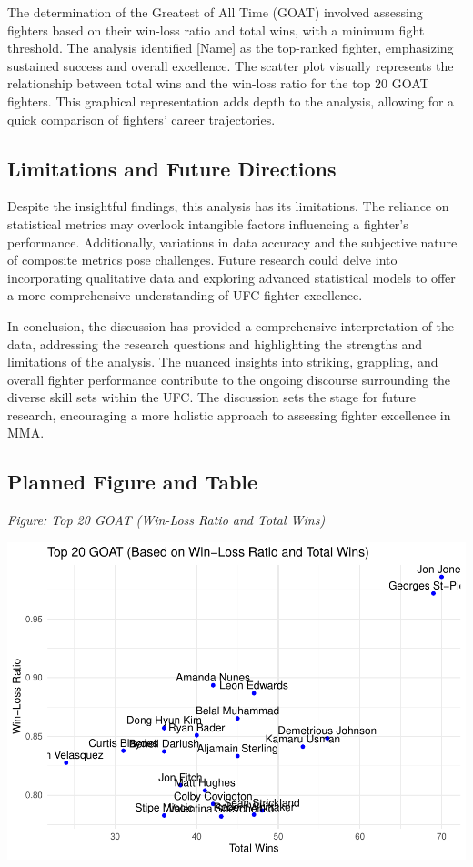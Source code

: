 \documentclass[
  man,floatsintext]{apa6}
\begin{document}
The determination of the Greatest of All Time (GOAT) involved assessing fighters based on their win-loss ratio and total wins, with a minimum fight threshold. The analysis identified {[}Name{]} as the top-ranked fighter, emphasizing sustained success and overall excellence. The scatter plot visually represents the relationship between total wins and the win-loss ratio for the top 20 GOAT fighters. This graphical representation adds depth to the analysis, allowing for a quick comparison of fighters' career trajectories.

\hypertarget{limitations-and-future-directions}{%
\subsection{Limitations and Future Directions}\label{limitations-and-future-directions}}

Despite the insightful findings, this analysis has its limitations. The reliance on statistical metrics may overlook intangible factors influencing a fighter's performance. Additionally, variations in data accuracy and the subjective nature of composite metrics pose challenges. Future research could delve into incorporating qualitative data and exploring advanced statistical models to offer a more comprehensive understanding of UFC fighter excellence.

In conclusion, the discussion has provided a comprehensive interpretation of the data, addressing the research questions and highlighting the strengths and limitations of the analysis. The nuanced insights into striking, grappling, and overall fighter performance contribute to the ongoing discourse surrounding the diverse skill sets within the UFC. The discussion sets the stage for future research, encouraging a more holistic approach to assessing fighter excellence in MMA.

\hypertarget{planned-figure-and-table}{%
\subsection{Planned Figure and Table}\label{planned-figure-and-table}}

\emph{Figure: Top 20 GOAT (Win-Loss Ratio and Total Wins)}

\includegraphics{Into-the-UFC--outline-_files/figure-latex/unnamed-chunk-1-1.pdf}
\end{document}

